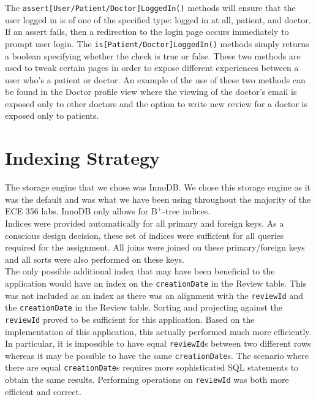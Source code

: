 \documentclass{article}
\begin{document}
The \texttt{assert[User/Patient/Doctor]LoggedIn()} methods will ensure that the user logged in is of one of the specified type: logged in at all, patient, and doctor. If an assert fails, then a redirection to the login page occurs immediately to prompt user login. The \texttt{is[Patient/Doctor]LoggedIn()} methods simply returns a boolean specifying whether the check is true or false. These two methods are used to tweak certain pages in order to expose different experiences between a user who's a patient or doctor. An example of the use of these two methods can be found in the Doctor profile view where the viewing of the doctor's email is exposed only to other doctors and the option to write new review for a doctor is exposed only to patients.


\section{Indexing Strategy}
The storage engine that we chose was InnoDB. We chose this storage engine as it was the default and was what we have been using throughout the majority of the ECE 356 labs. InnoDB only allows for $\mathrm{B}^+$-tree indices. \\

Indices were provided automatically for all primary and foreign keys. As a conscious design decision, these set of indices were sufficient for all queries required for the assignment. All joins were joined on these primary/foreign keys and all sorts were also performed on these keys. \\

The only possible additional index that may have been beneficial to the application would have an index on the \texttt{creationDate} in the Review table. This was not included as an index as there was an alignment with the \texttt{reviewId} and the \texttt{creationDate} in the Review table. Sorting and projecting against the \texttt{reviewId} proved to be sufficient for this application. Based on the implementation of this application, this actually performed much more efficiently. In particular, it is impossible to have equal \texttt{reviewId}s between two different rows whereas it may be possible to have the same \texttt{creationDate}s. The scenario where there are equal \texttt{creationDate}s requires more sophisticated SQL statements to obtain the same results. Performing operations on \texttt{reviewId} was both more efficient and correct.
\end{document}

